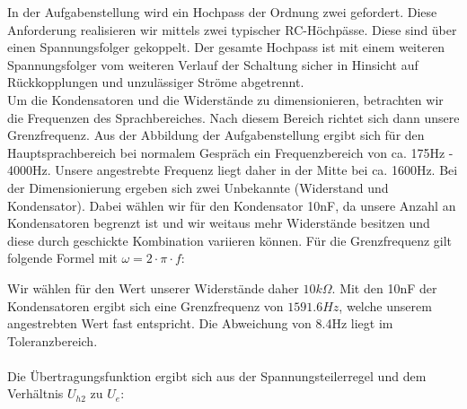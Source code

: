 In der Aufgabenstellung wird ein Hochpass der Ordnung zwei gefordert. Diese Anforderung realisieren wir mittels zwei typischer RC-Höchpässe. Diese sind über einen Spannungsfolger gekoppelt. Der gesamte Hochpass ist mit einem weiteren Spannungsfolger vom weiteren Verlauf der Schaltung sicher in Hinsicht auf Rückkopplungen und unzulässiger Ströme abgetrennt.
\\
Um die Kondensatoren und die Widerstände zu dimensionieren, betrachten wir die Frequenzen des Sprachbereiches. Nach diesem Bereich richtet sich dann unsere Grenzfrequenz. Aus der Abbildung der Aufgabenstellung ergibt sich für den Hauptsprachbereich bei normalem Gespräch ein Frequenzbereich von ca. 175Hz - 4000Hz. Unsere angestrebte Frequenz liegt daher in der Mitte bei ca. 1600Hz. Bei der Dimensionierung ergeben sich zwei Unbekannte (Widerstand und Kondensator). Dabei wählen wir für den Kondensator 10nF, da unsere Anzahl an Kondensatoren begrenzt ist und wir weitaus mehr Widerstände besitzen und diese durch geschickte Kombination variieren können. Für die Grenzfrequenz gilt folgende Formel mit $\omega = 2\cdot \pi \cdot f$: 

\newpage
{}

Wir wählen für den Wert unserer Widerstände daher $10k\Omega$. Mit den 10nF der Kondensatoren ergibt sich eine Grenzfrequenz von $1591.6Hz$, welche unserem angestrebten Wert fast entspricht. Die Abweichung von 8.4Hz liegt im Toleranzbereich.
\\
\\
Die Übertragungsfunktion ergibt sich aus der Spannungsteilerregel und dem Verhältnis $U_{h2}$ zu $U_{e}$:

